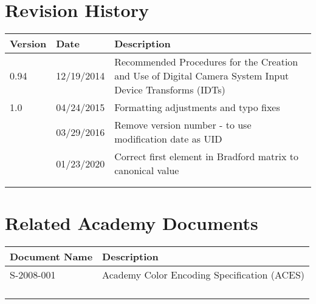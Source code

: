 \prelimsectionformat	%
\chapter{Revision History}

\begin{tabularx}{\linewidth}{|l|l|X|}
    \hline
    Version & Date       & Description \\ \hline
    0.94    & 12/19/2014 & Recommended Procedures for the Creation and Use of Digital Camera System Input Device Transforms (IDTs) \\ \hline
    1.0     & 04/24/2015 & Formatting adjustments and typo fixes \\ \hline
            & 03/29/2016 & Remove version number - to use modification date as UID \\ \hline
            & 01/23/2020 & Correct first element in Bradford matrix to canonical value \\ \hline
            & &  \\ \hline
            & &  \\ \hline
\end{tabularx}

\vspace{0.25in} %

\chapter{Related Academy Documents} %
\begin{tabularx}{\linewidth}{|l|X|}
    \hline
    Document Name & Description  
    \\ \hline
    S-2008-001 & Academy Color Encoding Specification (ACES) \\ \hline
    & \\ \hline
    & \\ \hline
    & \\ \hline
    & \\ \hline
\end{tabularx}